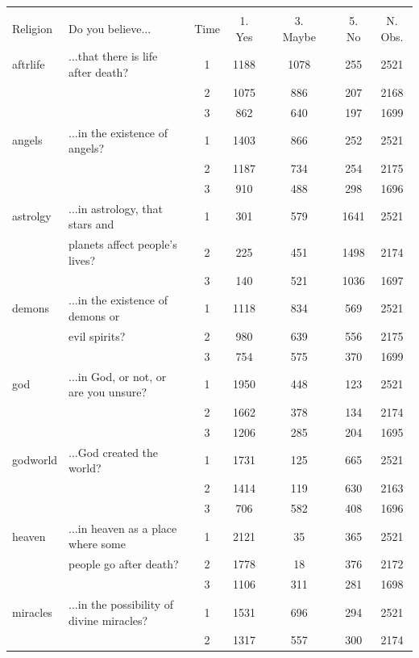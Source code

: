 \documentclass[12pt,]{article}
\begin{document}
\begin{table}
\scriptsize
\begin{center}
\begin{tabular}{l l c c c c c c c}
\hline
\\
Religion & Do you believe... & Time & 1. Yes &   & 3. Maybe &   & 5. No & N. Obs.\\
\hline
 aftrlife &  ...that there is life after death? & 1 & 1188 &  & 1078 &  & 255 & 2521\\
 &  & 2 & 1075 &  & 886 &  & 207 & 2168\\
 &  & 3 & 862 &  & 640 &  & 197 & 1699\\
 angels &  ...in the existence of angels? & 1 & 1403 &  & 866 &  & 252 & 2521\\
 &  & 2 & 1187 &  & 734 &  & 254 & 2175\\
 &  & 3 & 910 &  & 488 &  & 298 & 1696\\
 astrolgy  & ...in astrology, that stars and  & 1 & 301 &  & 579 &  & 1641 & 2521\\
 & planets affect people's lives? & 2 & 225 &  & 451 &  & 1498 & 2174\\
 &  & 3 & 140 &  & 521 &  & 1036 & 1697\\
 demons  & ...in the existence of demons or  & 1 & 1118 &  & 834 &  & 569 & 2521\\
 & evil spirits? & 2 & 980 &  & 639 &  & 556 & 2175\\
 & & 3 & 754 &  & 575 &  & 370 & 1699\\
 god & ...in God, or not, or are you unsure? & 1 & 1950 &  & 448 &  & 123 & 2521\\
 & & 2 & 1662 &  & 378 &  & 134 & 2174\\
 &  & 3 & 1206 &  & 285 &  & 204 & 1695\\
 godworld & ...God created the world? & 1 & 1731 &  & 125 &  & 665 & 2521\\
 &  & 2 & 1414 &  & 119 &  & 630 & 2163\\
 &  & 3 & 706 &  & 582 &  & 408 & 1696\\
 heaven & ...in heaven as a place where some  & 1 & 2121 &  & 35 &  & 365 & 2521\\
 & people go after death? & 2 & 1778 &  & 18 &  & 376 & 2172\\
 & & 3 & 1106 &  & 311 &  & 281 & 1698\\
 miracles & ...in the possibility of divine miracles? & 1 & 1531 &  & 696 &  & 294 & 2521\\
 & & 2 & 1317 &  & 557 &  & 300 & 2174\\

\end{tabular}
\end{center}
\end{table}
\end{document}
